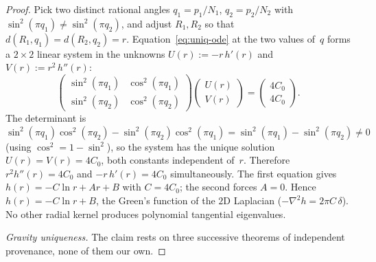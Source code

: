 \begin{proof}
Pick two distinct rational angles
$q_1 = p_1/N_1$, $q_2 = p_2/N_2$ with
$\sin^2(\pi q_1) \ne \sin^2(\pi q_2)$,
and adjust $R_1, R_2$ so that
$d(R_1, q_1) = d(R_2, q_2) = r$.
Equation~\eqref{eq:uniq-ode} at the two values of~$q$
forms a $2 \times 2$ linear system in the unknowns
$U(r) := -r\,h'(r)$ and $V(r) := r^2\,h''(r)$:
\[
  \begin{pmatrix} \sin^2(\pi q_1) & \cos^2(\pi q_1) \\
                  \sin^2(\pi q_2) & \cos^2(\pi q_2)
  \end{pmatrix}
  \begin{pmatrix} U(r) \\ V(r) \end{pmatrix}
  = \begin{pmatrix} 4C_0 \\ 4C_0 \end{pmatrix}.
\]
The determinant is
$\sin^2(\pi q_1)\cos^2(\pi q_2)
- \sin^2(\pi q_2)\cos^2(\pi q_1)
= \sin^2(\pi q_1) - \sin^2(\pi q_2) \ne 0$
(using $\cos^2 = 1 - \sin^2$),
so the system has the unique solution
$U(r) = V(r) = 4C_0$, both constants independent of~$r$.
Therefore
$r^2 h''(r) = 4C_0$ and $-r\,h'(r) = 4C_0$
simultaneously.
The first equation gives $h(r) = -C\ln r + Ar + B$
with $C = 4C_0$; the second forces $A = 0$.
Hence $h(r) = -C\ln r + B$, the Green's function of the
$2$D Laplacian ($-\nabla^2 h = 2\pi C\,\delta$).
No other radial kernel produces polynomial
tangential eigenvalues.

\emph{Gravity uniqueness.}
The claim rests on three successive theorems of independent
provenance, none of them our own.


\end{proof}
